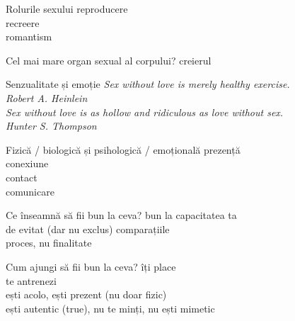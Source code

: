 \documentclass{simple}
\begin{document}
\begin{frame}{Rolurile sexului}
  \centering
  \Large
  \pause
  reproducere \\
  \vspace{1cm}
  \pause
  recreere \\
  \vspace{1cm}
  \pause
  romantism
\end{frame}

\begin{frame}{Cel mai mare organ sexual al corpului?}
  \centering
  \LARGE
  \pause
  creierul
\end{frame}

\begin{frame}{Senzualitate și emoție}
  \centering
  \pause
  \vspace{5mm}
  \textit{Sex without love is merely healthy exercise.} \\
  \vspace{3mm}
  \hfill \textit{Robert A. Heinlein} \\
  \pause
  \vspace{1cm}
  \textit{Sex without love is as hollow and ridiculous as love without sex.} \\
  \vspace{3mm}
  \hfill \textit{Hunter S. Thompson}
\end{frame}

\begin{frame}{Fizică / biologică și psihologică / emoțională}
  \centering
  \LARGE
  \pause
  prezență \\
  \vspace{1cm}
  \pause
  conexiune \\
  \vspace{1cm}
  \pause
  contact \\
  \vspace{1cm}
  \pause
  comunicare
\end{frame}

\begin{frame}{Ce înseamnă să fii bun la ceva?}
  \centering
  \Large
  \pause
  bun la capacitatea ta \\
  \vspace{1cm}
  \pause
  de evitat (dar nu exclus) comparațiile \\
  \vspace{1cm}
  \pause
  proces, nu finalitate
\end{frame}

\begin{frame}{Cum ajungi să fii bun la ceva?}
  \centering
  \Large
  \pause
  îți place \\
  \vspace{1cm}
  \pause
  te antrenezi \\
  \vspace{1cm}
  \pause
  ești acolo, ești prezent (nu doar fizic) \\
  \vspace{1cm}
  \pause
  ești autentic (true), nu te minți, nu ești mimetic
\end{frame}
\end{document}
